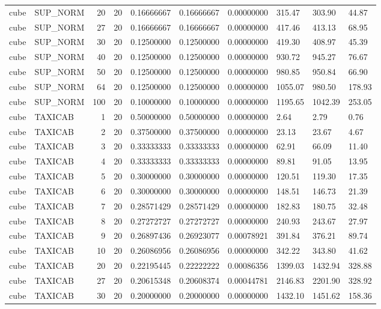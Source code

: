 \begin{longtable}{llrrllllll}
cube & SUP\_NORM & 20 & 20 & 0.16666667 & 0.16666667 & 0.00000000 & 315.47 & 303.90 & 44.87 \\
cube & SUP\_NORM & 27 & 20 & 0.16666667 & 0.16666667 & 0.00000000 & 417.46 & 413.13 & 68.95 \\
cube & SUP\_NORM & 30 & 20 & 0.12500000 & 0.12500000 & 0.00000000 & 419.30 & 408.97 & 45.39 \\
cube & SUP\_NORM & 40 & 20 & 0.12500000 & 0.12500000 & 0.00000000 & 930.72 & 945.27 & 76.67 \\
cube & SUP\_NORM & 50 & 20 & 0.12500000 & 0.12500000 & 0.00000000 & 980.85 & 950.84 & 66.90 \\
cube & SUP\_NORM & 64 & 20 & 0.12500000 & 0.12500000 & 0.00000000 & 1055.07 & 980.50 & 178.93 \\
cube & SUP\_NORM & 100 & 20 & 0.10000000 & 0.10000000 & 0.00000000 & 1195.65 & 1042.39 & 253.05 \\
cube & TAXICAB & 1 & 20 & 0.50000000 & 0.50000000 & 0.00000000 & 2.64 & 2.79 & 0.76 \\
cube & TAXICAB & 2 & 20 & 0.37500000 & 0.37500000 & 0.00000000 & 23.13 & 23.67 & 4.67 \\
cube & TAXICAB & 3 & 20 & 0.33333333 & 0.33333333 & 0.00000000 & 62.91 & 66.09 & 11.40 \\
cube & TAXICAB & 4 & 20 & 0.33333333 & 0.33333333 & 0.00000000 & 89.81 & 91.05 & 13.95 \\
cube & TAXICAB & 5 & 20 & 0.30000000 & 0.30000000 & 0.00000000 & 120.51 & 119.30 & 17.35 \\
cube & TAXICAB & 6 & 20 & 0.30000000 & 0.30000000 & 0.00000000 & 148.51 & 146.73 & 21.39 \\
cube & TAXICAB & 7 & 20 & 0.28571429 & 0.28571429 & 0.00000000 & 182.83 & 180.75 & 32.48 \\
cube & TAXICAB & 8 & 20 & 0.27272727 & 0.27272727 & 0.00000000 & 240.93 & 243.67 & 27.97 \\
cube & TAXICAB & 9 & 20 & 0.26897436 & 0.26923077 & 0.00078921 & 391.84 & 376.21 & 89.74 \\
cube & TAXICAB & 10 & 20 & 0.26086956 & 0.26086956 & 0.00000000 & 342.22 & 343.80 & 41.62 \\
cube & TAXICAB & 20 & 20 & 0.22195445 & 0.22222222 & 0.00086356 & 1399.03 & 1432.94 & 328.88 \\
cube & TAXICAB & 27 & 20 & 0.20615348 & 0.20608374 & 0.00044781 & 2146.83 & 2201.90 & 328.92 \\
cube & TAXICAB & 30 & 20 & 0.20000000 & 0.20000000 & 0.00000000 & 1432.10 & 1451.62 & 158.36 \\

\end{longtable}
